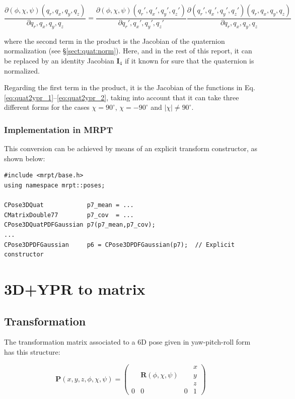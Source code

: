 \documentclass[a4paper,11pt]{report}
\begin{document}
\begin{equation}
\frac{\partial (\phi,\chi,\psi)(q_r,q_x,q_y,q_z)}{\partial q_r,q_x,q_y,q_z} =
\frac{\partial (\phi,\chi,\psi)(q_r',q_x',q_y',q_z')}{\partial q_r',q_x',q_y',q_z'}
\frac{\partial (q_r',q_x',q_y',q_z')(q_r,q_x,q_y,q_z)}{\partial q_r,q_x,q_y,q_z}  
\end{equation}

\noindent where the second term in the product is the Jacobian of the quaternion 
normalization (see \S \ref{sect:quat:norm}). Here, and in the rest of this report, 
it can be replaced by an identity Jacobian $\mathbf{I}_4$ if it known for sure that 
the quaternion is normalized. 

Regarding the first term in the product, it is the 
Jacobian of the functions in Eq. \ref{eq:quat2ypr_1}--\ref{eq:quat2ypr_2}, taking
into account that it can take three different forms for the cases $\chi=90^\circ$,
$\chi=-90^\circ$ and $|\chi| \neq 90^\circ$.

\subsubsection{Implementation in MRPT}

This conversion can be achieved by means of an explicit transform constructor, as shown below:

\begin{lstlisting}
#include <mrpt/base.h> 
using namespace mrpt::poses; 

CPose3DQuat            p7_mean = ...
CMatrixDouble77        p7_cov  = ...
CPose3DQuatPDFGaussian p7(p7_mean,p7_cov);
...
CPose3DPDFGaussian     p6 = CPose3DPDFGaussian(p7);  // Explicit constructor
\end{lstlisting}


\section{3D+YPR to matrix }
\label{sect:ypr2mat}

\subsection{Transformation}

The transformation matrix associated to a 6D pose given in yaw-pitch-roll form has this structure:

\begin{equation}
\mathbf{P}(x,y,z,\phi,\chi,\psi)=\left(
  \begin{array}{ccc|c}
   & & & x \\
   & \mathbf{R}(\phi,\chi,\psi) & & y \\
   & & & z \\ \hline
   0 & 0 & 0& 1
  \end{array}
\right)
\label{eq:matP_ypr}
\end{equation}
\end{document}
